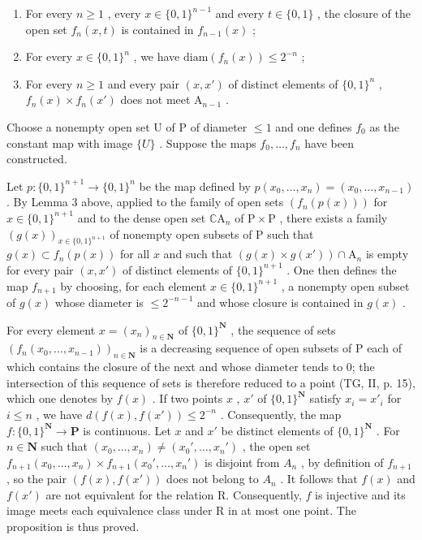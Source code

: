 \begin{enumerate}
\def\labelenumi{(\roman{enumi})}
\item
  For every \(n \geqslant 1\) , every \(x \in \{0,1\}^{n-1}\) and every \(t \in \{0,1\}\) , the closure of the open set \(f_n(x,t)\) is contained in \(f_{n-1}(x)\) ;
\item
  For every \(x \in \{0,1\}^n\) , we have \(\mathrm{diam}(f_n(x)) \leqslant 2^{-n}\) ;
\item
  For every \(n \geqslant 1\) and every pair \((x, x')\) of distinct elements of \(\{0, 1\}^n\) , \(f_n(x) \times f_n(x')\) does not meet \(\mathrm{A}_{n-1}\) .
\end{enumerate}

Choose a nonempty open set U of P of diameter \(\leqslant 1\) and one defines \(f_{0}\) as the constant map with image \(\{U\}\) . Suppose the maps \(f_{0}, \ldots, f_{n}\) have been constructed.

Let \(p \colon \{0,1\}^{n+1} \to \{0,1\}^n\) be the map defined by \(p(x_0, \ldots, x_n) = (x_0, \ldots, x_{n-1})\) . By Lemma 3 above, applied to the family of open sets \((f_n(p(x)))\) for \(x \in \{0,1\}^{n+1}\) and to the dense open set \(\mathbb{C}\mathrm{A}_n\) of \(\mathrm{P} \times \mathrm{P}\) , there exists a family \((g(x))_{x \in \{0,1\}^{n+1}}\) of nonempty open subsets of P such that \(g(x) \subset f_n(p(x))\) for all \(x\) and such that \((g(x) \times g(x')) \cap \mathrm{A}_n\) is empty for every pair \((x,x')\) of distinct elements of \(\{0,1\}^{n+1}\) . One then defines the map \(f_{n+1}\) by choosing, for each element \(x \in \{0,1\}^{n+1}\) , a nonempty open subset of \(g(x)\) whose diameter is \(\leqslant 2^{-n-1}\) and whose closure is contained in \(g(x)\) .

For every element \(x = (x_n)_{n \in \mathbf{N}}\) of \(\{0,1\}^{\mathbf{N}}\) , the sequence of sets \((f_n(x_0, \ldots, x_{n-1}))_{n \in \mathbf{N}}\) is a decreasing sequence of open subsets of P each of which contains the closure of the next and whose diameter tends to 0; the intersection of this sequence of sets is therefore reduced to a point (TG, II, p. 15), which one denotes by \(f(x)\) . If two points \(x\) , \(x'\) of \(\{0,1\}^{\mathbf{N}}\) satisfy \(x_i = x'_i\) for \(i \leqslant n\) , we have \(d(f(x), f(x')) \leqslant 2^{-n}\) . Consequently, the map \(f: \{0,1\}^{\mathbf{N}} \to \mathbf{P}\) is continuous. Let \(x\) and \(x'\) be distinct elements of \(\{0,1\}^{\mathbf{N}}\) . For \(n \in \mathbf{N}\) such that \((x_0, \ldots, x_n) \neq (x_0', \ldots, x_n')\) , the open set \(f_{n+1}(x_0, \ldots, x_n) \times f_{n+1}(x_0', \ldots, x_n')\) is disjoint from \(A_n\) , by definition of \(f_{n+1}\) , so the pair \((f(x), f(x'))\) does not belong to \(A_n\) . It follows that \(f(x)\) and \(f(x')\) are not equivalent for the relation R. Consequently, \(f\) is injective and its image meets each equivalence class under R in at most one point. The proposition is thus proved.

